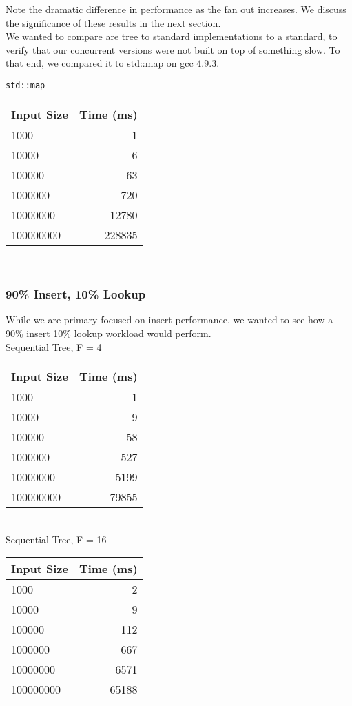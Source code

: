\documentclass{sig-alternate}
\begin{document}
Note the dramatic difference in performance as the fan out increases. 
We discuss the significance of these results in the next section.\\

We wanted to compare are tree to standard implementations to a standard, to verify that our concurrent versions were not built on top of something slow.  To that end, we compared it to std::map on gcc 4.9.3.

\texttt{std::map}\\
\begin{tabular}{| l | r |}
  \hline
  Input Size & Time (ms)\\  \hline
  1000			&	1	\\
  10000			&	6	\\
  100000		&	63	\\
  1000000		&	720	\\
  10000000		&	12780	\\
  100000000		&	228835	\\
  \hline
\end{tabular}\\

\subsubsection{90\% Insert, 10\% Lookup}
While we are primary focused on insert performance, we wanted to see how a 90\% insert 10\% lookup workload would perform.\\
Sequential Tree, F = 4\\
\begin{tabular}{| l | r |}
  \hline
  Input Size & Time (ms)\\  \hline
  1000			&	1	\\
  10000			&	9	\\
  100000		&	58	\\
  1000000		&	527	\\
  10000000		&	5199	\\
  100000000		&	79855	\\
  \hline
\end{tabular} \\

Sequential Tree, F = 16\\
\begin{tabular}{| l | r |}
  \hline
  Input Size & Time (ms)\\  \hline
  1000			&	2	\\
  10000			&	9	\\
  100000		&	112	\\
  1000000		&	667	\\
  10000000		&	6571	\\
  100000000		&	65188	\\
  \hline
\end{tabular} \\
\end{document}
